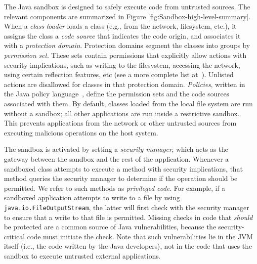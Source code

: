 \documentclass{sig-alternate}
\begin{document}
The Java sandbox is designed to safely execute code from untrusted
sources. 
The relevant components are summarized in Figure
\ref{fig:Sandbox-high-level-summary}. 
When a \textit{class loader} loads a class (e.g., from
the network, filesystem, etc.), it assigns the class a \textit{code source} that
indicates the code origin, and associates it with a \textit{protection
  domain}. Protection domains segment the classes into groups by
\textit{permission set}. These sets
contain permissions that explicitly allow actions with security
implications, such as writing to the filesystem, accessing the network, using
certain reflection features, etc (see a more complete list
at~\cite{_permissions_2014}).  Unlisted actions are disallowed for classes in
that protection domain.  \emph{Policies}, written in the Java policy
language~\cite{_java_policy_language}, define the permission sets and the code
sources associated with them. 
By default, classes loaded from the local file system are run
without a sandbox; all other applications are run inside a restrictive
sandbox.  This prevents applications from the network or other untrusted sources
from executing malicious operations on the host system.

The sandbox is activated by setting a \emph{security manager}, which acts as the
gateway between the sandbox and the rest of the application. Whenever a
sandboxed class attempts to execute a method with security implications, that
method queries the security manager to determine if the operation should be
permitted.  We refer to such methods as \emph{privileged code}.  For example, if
a sandboxed application attempts to write to a file by using
\texttt{java.io.FileOutputStream}, the latter will first
check with the security manager to ensure that a write to that file is
permitted.  Missing checks in code that \emph{should} be protected are a common
source of Java vulnerabilities, because the security-critical code must initiate
the check.  Note that such vulnerabilities lie in the JVM itself (i.e., the code
written by the Java developers), not in the code that uses the sandbox to
execute untrusted external applications.
\end{document}

